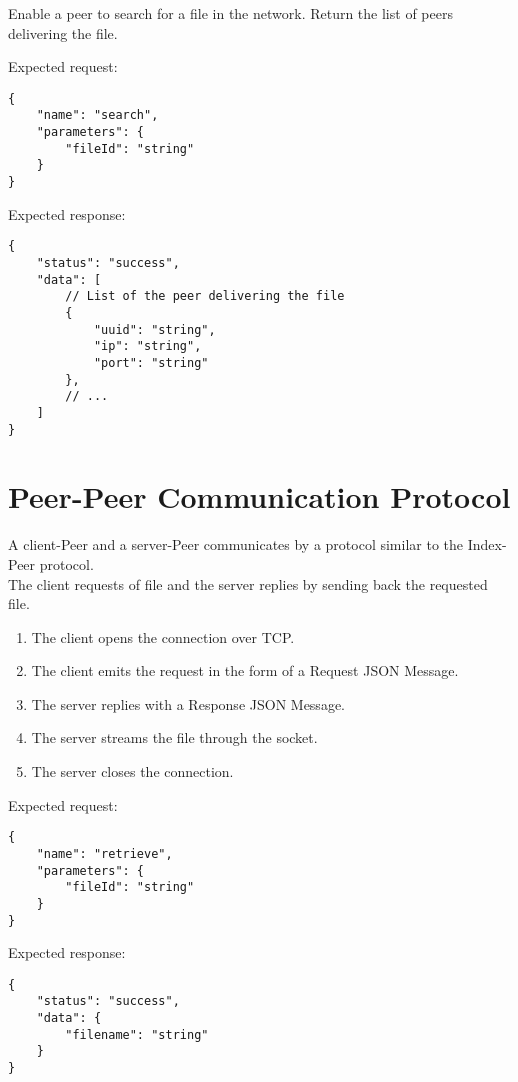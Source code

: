 \documentclass{article}
\begin{document}
Enable a peer to search for a file in the network. Return the list of peers delivering the file.

\noindent Expected request:

\begin{Verbatim}[tabsize=4]
{
    "name": "search",
    "parameters": {
        "fileId": "string"
    }
}
\end{Verbatim}

\noindent Expected response:

\begin{Verbatim}[tabsize=4]
{
    "status": "success",
    "data": [
        // List of the peer delivering the file
        {
            "uuid": "string",
            "ip": "string",
            "port": "string"
        },
        // ...
    ]
}
\end{Verbatim}

\section{Peer-Peer Communication Protocol}

A client-Peer and a server-Peer communicates by a protocol similar to the Index-Peer protocol. \\
The client requests of file and the server replies by sending back the requested file.

\begin{enumerate}
	\item The client opens the connection over TCP.
	\item The client emits the request in the form of a Request JSON Message.
	\item The server replies with a Response JSON Message.
	\item The server streams the file through the socket.
	\item The server closes the connection.
\end{enumerate}

\noindent Expected request:

\begin{Verbatim}[tabsize=4]
{
    "name": "retrieve",
    "parameters": {
        "fileId": "string"
    }
}
\end{Verbatim}

\noindent Expected response:

\begin{Verbatim}[tabsize=4]
{
    "status": "success",
    "data": {
        "filename": "string"
    }
}
\end{Verbatim}
\end{document}
